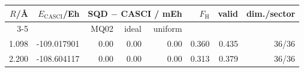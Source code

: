 \begin{tabular}{rrrrrrrr}
\toprule
$R$/\AA & $E_\mathrm{CASCI}$/Eh & \multicolumn{3}{c}{SQD $-$ CASCI / mEh} & $F_\mathrm{H}$ & valid & dim./sector \\
\cmidrule(lr){3-5}
 & & MQ02 & ideal & uniform & & & \\
\midrule
1.098 & -109.017901 & 0.00 & 0.00 & 0.00 & 0.360 & 0.435 & 36/36 \\
2.200 & -108.604117 & 0.00 & 0.00 & 0.00 & 0.313 & 0.379 & 36/36 \\
\bottomrule
\end{tabular}
